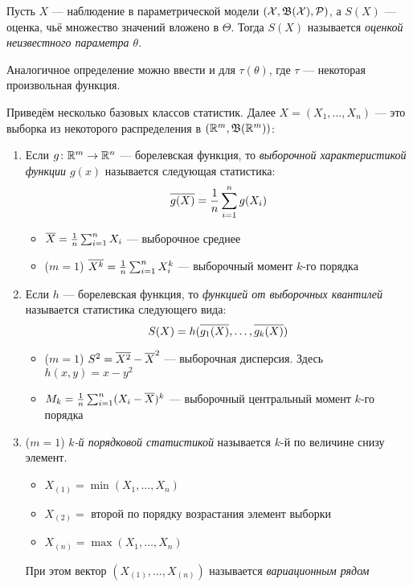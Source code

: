 \begin{definition}
	Пусть $X$ --- наблюдение в параметрической модели $(\mathcal{X}, \mathfrak{B}(\mathcal{X}), \mathcal{P})$, а $S(X)$ --- оценка, чьё множество значений вложено в $\Theta$. Тогда $S(X)$ называется \textit{оценкой неизвестного параметра $\theta$}.
\end{definition}

\begin{note}
	Аналогичное определение можно ввести и для $\tau(\theta)$, где $\tau$ --- некоторая произвольная функция.
\end{note}

\begin{example}
	Приведём несколько базовых классов статистик. Далее $X = (X_1, \ldots, X_n)$ --- это выборка из некоторого распределения в $(\mathbb{R}^m, \mathfrak{B}(\mathbb{R}^m))$:
	\begin{enumerate}
		\item Если $g \colon \mathbb{R}^m \to \mathbb{R}^n$ --- борелевская функция, то \textit{выборочной характеристикой функции $g(x)$} называется следующая статистика:
		\[
			\overline{g(X)} = \frac{1}{n} \sum_{i = 1}^n g(X_i)
		\]
		\begin{itemize}
			\item $\overline{X} = \frac{1}{n} \sum_{i = 1}^n X_i$ --- выборочное среднее
			
			\item ($m = 1$) $\overline{X^k} = \frac{1}{n} \sum_{i = 1}^n X_i^k$ --- выборочный момент $k$-го порядка
		\end{itemize}
		
		\item Если $h$ --- борелевская функция, то \textit{функцией от выборочных квантилей} называется статистика следующего вида:
		\[
			S(X) = h(\overline{g_1(X)}, \ldots, \overline{g_k(X)})
		\]
		\begin{itemize}
			\item ($m = 1$) $S^2 = \overline{X^2} - \overline{X}^2$ --- выборочная дисперсия. Здесь $h(x, y) = x - y^2$
			
			\item $M_k = \frac{1}{n} \sum_{i = 1}^n (X_i - \overline{X})^k$ --- выборочный центральный момент $k$-го порядка
		\end{itemize}
	
		\item ($m = 1$) \textit{$k$-й порядковой статистикой} называется $k$-й по величине снизу элемент.
		\begin{itemize}
			\item $X_{(1)} = \min(X_1, \ldots, X_n)$
			
			\item $X_{(2)} =$ второй по порядку возрастания элемент выборки
			
			\item $X_{(n)} = \max(X_1, \ldots, X_n)$
		\end{itemize}
		При этом вектор $(X_{(1)}, \ldots, X_{(n)})$ называется \textit{вариационным рядом}
	\end{enumerate}
\end{example}


